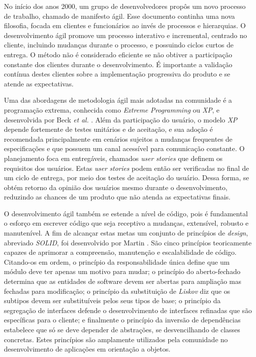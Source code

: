 No início dos anos 2000, um grupo de desenvolvedores propôs um novo processo de trabalho, chamado de manifesto ágil. Esse documento continha uma nova filosofia, focada em clientes e funcionários ao invés de processos e hierarquias. O desenvolvimento ágil promove um processo interativo e incremental, centrado no cliente, incluindo mudanças durante o processo, e possuindo ciclos curtos de entrega. O método não é considerado eficiente se não obtiver a participação constante dos clientes durante o desenvolvimento. É importante a validação contínua destes clientes sobre a implementação progressiva do produto e se atende as expectativas.

Uma das abordagens de metodologia ágil mais adotadas na comunidade é a programação extrema, conhecida como \emph{Extreme Programming} ou \emph{XP}, e desenvolvida por Beck \emph{et al.} \cite{beck1}. Além da participação do usuário, o modelo \emph{XP} depende fortemente de testes unitários e de aceitação, e sua adoção é recomendada principalmente em cenários sujeitos a mudanças frequentes de especificações e que possuem um canal acessível para comunicação constante. O planejamento foca em entregáveis, chamados \emph{user stories} que definem os requisitos dos usuários. Estas \emph{user stories} podem então ser verificadas no final de um ciclo de entrega, por meio dos testes de aceitação do usuário. Dessa forma, se obtém retorno da opinião dos usuários mesmo durante o desenvolvimento, reduzindo as chances de um produto que não atenda as expectativas finais.

O desenvolvimento ágil também se estende a nível de código, pois é fundamental o esforço em escrever código que seja receptivo a mudanças, extensível, robusto e manutenível. A fim de alcançar estas metas um conjunto de princípios de \emph{design}, abreviado \emph{SOLID}, foi desenvolvido por Martin \cite{martin}. São cinco princípios teoricamente capazes de aprimorar a compreensão, manutenção e escalabilidade de código. Citando-os em ordem, o princípio da responsabilidade única define que um módulo deve ter apenas um motivo para mudar; o princípio do aberto-fechado determina que as entidades de software devem ser abertas para ampliação mas fechadas para modificação; o princípio da substituição de \emph{Liskov} diz que os subtipos devem ser substituíveis pelos seus tipos de base; o princípio da segregação de interfaces defende o desenvolvimento de interfaces refinadas que são específicas para o cliente; e finalmente o princípio da inversão de dependências estabelece que só se deve depender de abstrações, se desvencilhando de classes concretas. Estes princípios são amplamente utilizados pela comunidade no desenvolvimento de aplicações em orientação a objetos.

